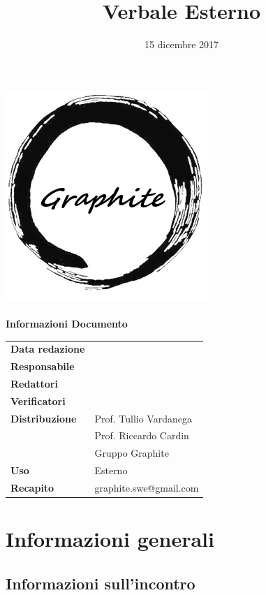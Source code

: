 \documentclass[openany,12pt,a4paper]{article}
\title{Verbale Esterno}
\author{}
\date{15 dicembre 2017}
\begin{document}
	\makeatletter
	\begin{titlepage}
		\setlength{\headsep}{0pt}  
		\begin{center}
			\includegraphics[width=0.5\linewidth]{Logo.png}\\[1em]
			{\huge \bfseries  \@title }\\[10ex]
			\textbf{\Large Informazioni Documento} \\[2em]
			\bgroup
			\def\arraystretch{1.5}
			\begin{tabular}{l|l}
				\textbf{Data redazione} & \large \@date \\
				\textbf{Responsabile} &  \\
				\textbf{Redattori} &  \\
				\textbf{Verificatori} &  \\
				\textbf{Distribuzione} & Prof. Tullio Vardanega \\
				 & Prof. Riccardo Cardin \\
				 & Gruppo Graphite \\
				\textbf{Uso} & Esterno \\
				\textbf{Recapito} & graphite.swe@gmail.com \\
			\end{tabular}
		\egroup
		\end{center}
	\end{titlepage}
	\makeatother

	\thispagestyle{empty}
	\newpage
	
	\section{Informazioni generali}
	
	\subsection{Informazioni sull'incontro}
	
\end{document}
